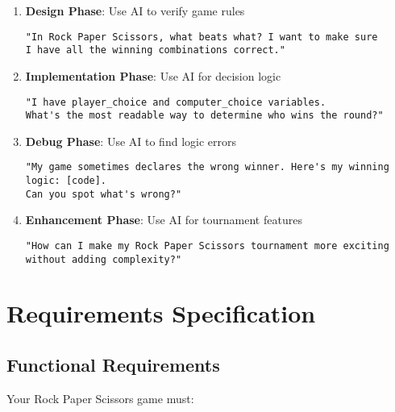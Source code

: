 \documentclass[
  letterpaper,
  DIV=11,
  numbers=noendperiod,
  oneside]{scrreprt}
\begin{document}
\begin{enumerate}
\def\labelenumi{\arabic{enumi}.}
\item
  \textbf{Design Phase}: Use AI to verify game rules

\begin{verbatim}
"In Rock Paper Scissors, what beats what? I want to make sure 
I have all the winning combinations correct."
\end{verbatim}
\item
  \textbf{Implementation Phase}: Use AI for decision logic

\begin{verbatim}
"I have player_choice and computer_choice variables. 
What's the most readable way to determine who wins the round?"
\end{verbatim}
\item
  \textbf{Debug Phase}: Use AI to find logic errors

\begin{verbatim}
"My game sometimes declares the wrong winner. Here's my winning logic: [code]. 
Can you spot what's wrong?"
\end{verbatim}
\item
  \textbf{Enhancement Phase}: Use AI for tournament features

\begin{verbatim}
"How can I make my Rock Paper Scissors tournament more exciting 
without adding complexity?"
\end{verbatim}
\end{enumerate}

\section{Requirements Specification}\label{requirements-specification-3}

\subsection{Functional Requirements}\label{functional-requirements-3}

Your Rock Paper Scissors game must:
\end{document}
